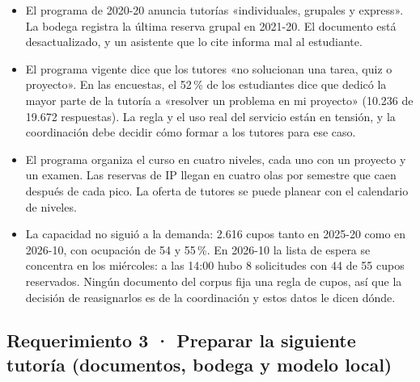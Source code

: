 \documentclass[11pt,letterpaper]{article}
\begin{document}
\begin{itemize}[leftmargin=1.5em,itemsep=2pt]
\item El programa de 2020-20 anuncia tutorías «individuales, grupales y express». La bodega registra la última reserva grupal en 2021-20. El documento está desactualizado, y un asistente que lo cite informa mal al estudiante.
\item El programa vigente dice que los tutores «no solucionan una tarea, quiz o proyecto». En las encuestas, el 52\,\% de los estudiantes dice que dedicó la mayor parte de la tutoría a «resolver un problema en mi proyecto» (10.236 de 19.672 respuestas). La regla y el uso real del servicio están en tensión, y la coordinación debe decidir cómo formar a los tutores para ese caso.
\item El programa organiza el curso en cuatro niveles, cada uno con un proyecto y un examen. Las reservas de IP llegan en cuatro olas por semestre que caen después de cada pico. La oferta de tutores se puede planear con el calendario de niveles.
\item La capacidad no siguió a la demanda: 2.616 cupos tanto en 2025-20 como en 2026-10, con ocupación de 54 y 55\,\%. En 2026-10 la lista de espera se concentra en los miércoles: a las 14:00 hubo 8 solicitudes con 44 de 55 cupos reservados. Ningún documento del corpus fija una regla de cupos, así que la decisión de reasignarlos es de la coordinación y estos datos le dicen dónde.
\end{itemize}

\subsection{Requerimiento 3 · Preparar la siguiente tutoría (documentos, bodega y modelo local)}
\label{sec:req3}
\end{document}

